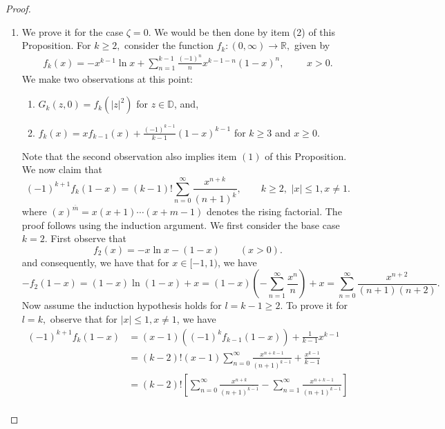 \documentclass[10pt,oneside,reqno]{amsart}
\theoremstyle{definition}
\theoremstyle{remark}
\newcommand{\abs}[1]{\left\lvert #1 \right\rvert}
\renewcommand{\le}{\leqslant}
\renewcommand{\ge}{\geqslant}
\newcommand{\R}{\mathbb R}
\numberwithin{equation}{section}
\begin{document}
\begin{proof}
\begin{enumerate}
	\item We prove it for the case $\zeta =0$. We would be then done by item (2) of this Proposition. For $k \ge 2,$ consider the function $f_{k} : \left( 0, \infty \right) \to \R ,$ given by
	\begin{align*}
	    f_{k}\left(x\right) = 
        -x^{k-1}\ln x+\sum_{n=1}^{k-1}\frac{\left(-1\right)^{n}}{n}x^{k-1-n}\left(1-x\right)^{n},\,\, \qquad  x > 0.
	\end{align*}
    We make two observations at this point: 
    \begin{enumerate}[label=(\roman*)]
        \item $G_{k} \left( z, 0 \right) = f_{k} \left( \abs{z}^{2} \right)$ for $z \in \mathbb D$, and, 
        \item $f_k (x) = x f_{k-1} (x) + \frac{(-1)^{k-1}}{k-1} (1-x)^{k-1}$ for $k \ge 3$ and $x \ge 0$.
    \end{enumerate}
Note that the second observation also implies item $(1)$ of this Proposition. We now claim that 
    \begin{equation*}
        (-1)^{k+1} f_k (1-x) = (k-1)! \sum_{n=0}^{\infty} \frac{x^{n+k}}{(n+1)^{\overline{k}}}, \qquad  k \ge 2 ,\,\, |x| \le 1, x \ne 1 .
    \end{equation*} where $(x)^{\overline{m}}= x(x+1)\cdots(x+m-1)$ denotes the rising factorial. The proof follows using the induction argument. We first consider the base case $k=2$. First observe that
    \begin{equation*}
        f_2 (x) =
	-x \ln x - (1-x) \qquad \left( x > 0 \right).
    \end{equation*}
and consequently, we have that for $x\in [-1, 1)$, we have
    \begin{equation*}
        -f_2 (1-x) = (1-x) \ln (1-x) + x 
                    = (1-x) \left( - \sum_{n=1}^{\infty} \frac{x^{n}}{n} \right) + x
                    = \sum_{n=0}^{\infty} \frac{x^{n+2}}{(n+1)(n+2)}.
    \end{equation*}
Now assume the induction hypothesis holds for $l=k-1 \ge 2$. To prove it for $l=k,$ observe that for $\abs{x} \le 1, x \ne 1$, we have
    \begin{align*}
        (-1)^{k+1} f_{k} (1-x) &= (x-1) \left( (-1)^{k} f_{k-1} (1-x) \right) + \frac{1}{k-1} x^{k-1} \\
        &= (k-2)! (x-1) \sum_{n=0}^{\infty} \frac{x^{n+k-1}}{(n+1)^{\overline{k-1}}} + \frac{x^{k-1}}{k-1} \\
        &= (k-2)! \left[\sum_{n=0}^{\infty} \frac{x^{n+k}}{(n+1)^{\overline{k-1}}} - \sum_{n=1}^{\infty} \frac{x^{n+k-1}}{(n+1)^{\overline{k-1}}} \right]\\

\end{align*}
\end{enumerate}
\end{proof}
\end{document}
